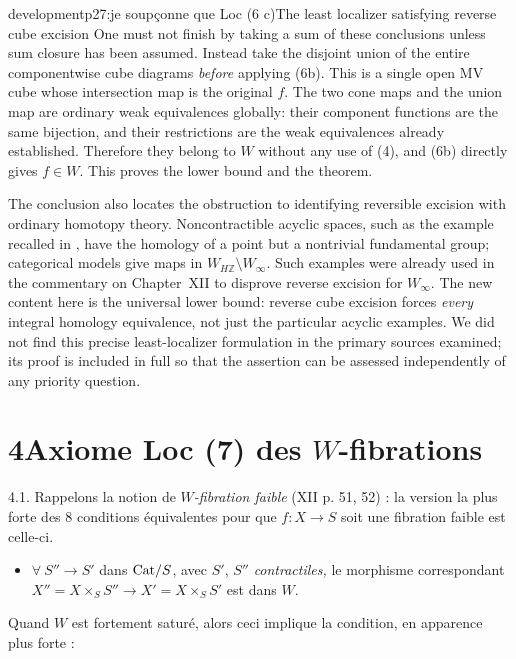 \begin{dcomment}{development}{p27:je soupçonne que Loc (6 c)}{The least localizer satisfying reverse cube excision}
One must not finish by taking a sum of these conclusions unless sum closure has been assumed. Instead take the disjoint union of the entire componentwise cube diagrams \emph{before} applying (6b). This is a single open MV cube whose intersection map is the original $f$. The two cone maps and the union map are ordinary weak equivalences globally: their component functions are the same bijection, and their restrictions are the weak equivalences already established. Therefore they belong to $W$ without any use of (4), and (6b) directly gives $f\in W$. This proves the lower bound and the theorem.

The conclusion also locates the obstruction to identifying reversible excision with ordinary homotopy theory. Noncontractible acyclic spaces, such as the example recalled in \citet[discussion following Corollary 4.33, p.~368]{Hatcher2002}, have the homology of a point but a nontrivial fundamental group; categorical models give maps in $W_{H\mathbb Z}\setminus W_\infty$. Such examples were already used in the commentary on Chapter~XII to disprove reverse excision for $W_\infty$. The new content here is the universal lower bound: reverse cube excision forces \emph{every} integral homology equivalence, not just the particular acyclic examples. We did not find this precise least-localizer formulation in the primary sources examined; its proof is included in full so that the assertion can be assessed independently of any priority question.
\end{dcomment}



\section*{4\quad Axiome Loc (7) des $W$-fibrations}

4.1. Rappelons la notion de \textit{$W$-fibration faible} (XII p. 51, 52) : la version la plus forte des 8 conditions équivalentes pour que $f : X \longrightarrow S$ soit une fibration faible est celle-ci.

\begin{itemize}[leftmargin=2cm]
\item[\textbf{(Ff)}] $\forall\ S'' \longrightarrow S'$ dans $\mathrm{Cat}/S$, avec $S'$, $S''$ \textit{contractiles,} le morphisme correspondant $X'' = X \times_S S'' \longrightarrow X' = X \times_S S'$ est dans $W$.
\end{itemize}

Quand $W$ est fortement saturé, alors ceci implique la condition, en apparence plus forte :

